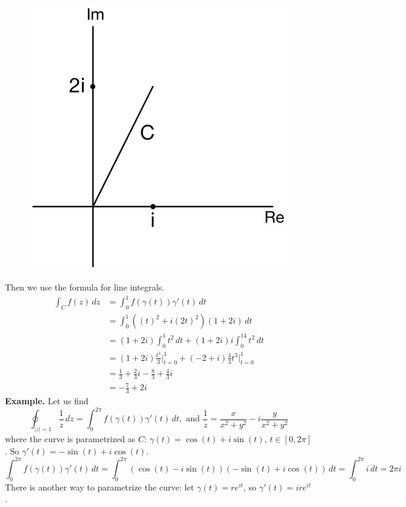 \documentclass[11pt]{article}
\begin{document}
\begin{figure}[H]
\includegraphics[scale = 0.2]{11_5}
\centering
\end{figure}
Then we use the formula for line integrals.
\begin{align*}
\int_C f(z) \, dz &= \int_0^1f(\gamma(t))\gamma'(t) \,dt \\ 
&= \int_0^1\left((t)^2 + i(2t)^2\right)(1 + 2i) \, dt \\
&= (1 + 2i)\int_0^1t^2 \, dt + (1 + 2i)i\int_0^14t^2 \, dt \\ 
&= (1 + 2i)\frac{t^3}{3} \bigg\rvert_{t = 0}^1 + (-2 + i)\frac{4}{3}t^3\bigg\rvert_{t = 0}^1 \\ 
&= \frac{1}{3} + \frac{2}{3}i - \frac{8}{3} + \frac{4}{3}i \\
&= -\frac{7}{3} + 2i
\end{align*}
\textbf{Example.} Let us find 
$$\oint_{|z| = 1} \frac{1}{z} \,dz = \int_{0}^{2\pi} f(\gamma(t))\gamma'(t) \,dt, \text{ and } \frac{1}{z} = \frac{x}{x^2 + y^2} - i\frac{y}{x^2 + y^2} $$ 
where the curve is parametrized as
$C$: $\gamma(t) = \cos(t) + i\sin(t)$, $t \in [0, 2\pi]$. So $\gamma'(t) = -\sin(t) + i\cos(t)$. 
$$\int_0^{2\pi}f(\gamma(t))\gamma'(t) \,dt = \int_0^{2\pi}(\cos(t) - i\sin(t))(-\sin(t) + i\cos(t)) \,dt = \int_0^{2\pi}i \,dt = 2\pi i$$
There is another way to parametrize the curve: let $\gamma(t) = re^{it}$, so $\gamma'(t) = ire^{it}$.
\end{document}
